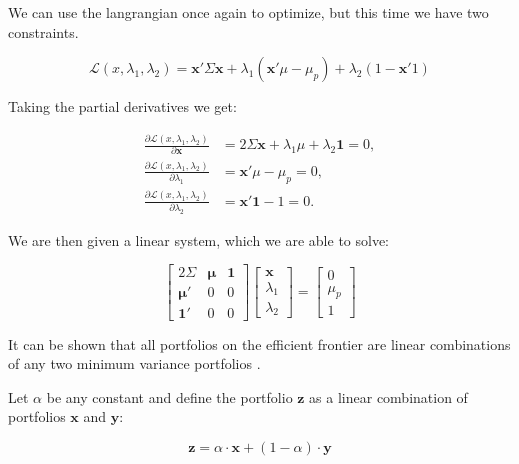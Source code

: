 \documentclass[journal,transmag]{IEEEtran}
\begin{document}
\noindent We can use the langrangian once again to optimize, but this time we have two constraints. 

\begin{equation}
  \mathcal{L}(x, \lambda_1, \lambda_2) = \mathbf{x}' \Sigma \mathbf{x} + \lambda_1 (\mathbf{x}' \mu - \mu_p) + \lambda_2 (1 - \mathbf{x}' 1)
\end{equation}

\noindent Taking the partial derivatives we get:

\begin{align}
\frac{\partial \mathcal{L}(x, \lambda_1, \lambda_2)}{\partial \mathbf{x}} &= 2\Sigma \mathbf{x} + \lambda_1 \mu + \lambda_2 \mathbf{1} = 0, \\
\frac{\partial \mathcal{L}(x, \lambda_1, \lambda_2)}{\partial \lambda_1} &= \mathbf{x}' \mu - \mu_p = 0, \\
\frac{\partial \mathcal{L}(x, \lambda_1, \lambda_2)}{\partial \lambda_2} &= \mathbf{x}' \mathbf{1} - 1 = 0.
\end{align}



We are then given a linear system, which we are able to solve:

\begin{equation}
\begin{bmatrix} 
2\Sigma & \mathbf{\mu} & \mathbf{1} \\
\mathbf{\mu}' & 0 & 0 \\
\mathbf{1}' & 0 & 0
\end{bmatrix}
\begin{bmatrix}
\mathbf{x} \\
\lambda_1 \\
\lambda_2
\end{bmatrix} = 
\begin{bmatrix}
0 \\
\mu_p \\
1
\end{bmatrix}
\end{equation}

It can be shown that all portfolios on the efficient frontier are linear combinations of any two minimum variance portfolios \cite{zivot2013}.

Let $\alpha$ be any constant and define the portfolio $\mathbf{z}$ as a linear combination of portfolios $\mathbf{x}$ and $\mathbf{y}$:

\begin{equation}
\mathbf{z} = \alpha \cdot \mathbf{x} + (1 - \alpha) \cdot \mathbf{y}
\end{equation}
\end{document}

